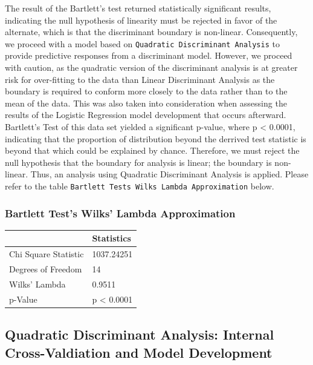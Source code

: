 \documentclass[american,]{article}
\begin{document}
The result of the Bartlett's test returned statistically significant results, indicating the null hypothesis of linearity must be rejected in favor of the alternate, which is that the discriminant boundary is non-linear. Consequently, we proceed with a model based on \texttt{Quadratic\ Discriminant\ Analysis} to provide predictive responses from a discriminant model. However, we proceed with caution, as the quadratic version of the discriminant analysis is at greater risk for over-fitting to the data than Linear Discriminant Analysis as the boundary is required to conform more closely to the data rather than to the mean of the data. This was also taken into consideration when assessing the results of the Logistic Regression model development that occurs afterward. Bartlett's Test of this data set yielded a significant p-value, where p \textless{} 0.0001, indicating that the proportion of distribution beyond the derrived test statistic is beyond that which could be explained by chance. Therefore, we must reject the null hypothesis that the boundary for analysis is linear; the boundary is non-linear. Thus, an analysis using Quadratic Discriminant Analysis is applied. Please refer to the table \texttt{Bartlett\ Test\textquotesingle{}s\ Wilks\textquotesingle{}\ Lambda\ Approximation} below.

\hypertarget{bartlett-tests-wilks-lambda-approximation}{%
\subsubsection{\texorpdfstring{\textbf{Bartlett Test's Wilks' Lambda Approximation}}{Bartlett Test's Wilks' Lambda Approximation}}\label{bartlett-tests-wilks-lambda-approximation}}

\begin{table}[H]
\centering
\begin{tabular}{ll}
\toprule
  & Statistics\\
\midrule
\rowcolor{gray!6}  Chi Square Statistic & 1037.24251\\
Degrees of Freedom & 14\\
\rowcolor{gray!6}  Wilks' Lambda & 0.9511\\
p-Value & p < 0.0001\\
\bottomrule
\end{tabular}
\end{table}

\hypertarget{quadratic-discriminant-analysis-internal-cross-valdiation-and-model-development}{%
\subsection{\texorpdfstring{\textbf{Quadratic Discriminant Analysis: Internal Cross-Valdiation and Model Development}}{Quadratic Discriminant Analysis: Internal Cross-Valdiation and Model Development}}\label{quadratic-discriminant-analysis-internal-cross-valdiation-and-model-development}}
\end{document}
